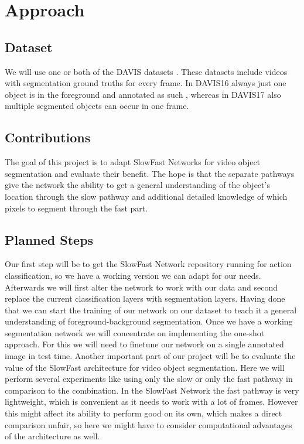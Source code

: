 \documentclass[conference]{IEEEtran}
\begin{document}
\section{Approach}
\subsection{Dataset}
We will use one or both of the DAVIS datasets \cite{davis_2016,davis_2017}. These datasets include videos with segmentation ground truths for every frame. In DAVIS16 always just one object is in the foreground and annotated as such , whereas in DAVIS17 also multiple segmented objects can occur in one frame. 
\subsection{Contributions}
The goal of this project is to adapt SlowFast Networks for video object segmentation and evaluate their benefit. The hope is that the separate pathways give the network the ability to get a general understanding of the object’s location through the slow pathway and additional detailed knowledge of which pixels to segment through the fast part.


\subsection{Planned Steps}
Our first step will be to get the SlowFast Network repository running for action classification, so we have a working version we can adapt for our needs. Afterwards  we will first alter the network to work with our data and second replace the current classification layers with segmentation layers. Having done that we can start the training of our network on our dataset to teach it a general understanding of foreground-background segmentation.
Once we have a working segmentation network we will concentrate on implementing the one-shot approach. For this we will need to finetune our network on a single annotated image in test time.
Another important part of our project will be to evaluate the value of the SlowFast architecture for video object segmentation. Here we will perform several experiments like using only the slow or only the fast pathway in comparison to the combination. In the SlowFast Network the fast pathway is very lightweight, which is convenient as it needs to work with a lot of frames. However this might affect its ability to perform good on its own, which makes a direct comparison unfair, so here we might have to consider computational advantages of the architecture as well.
\end{document}
